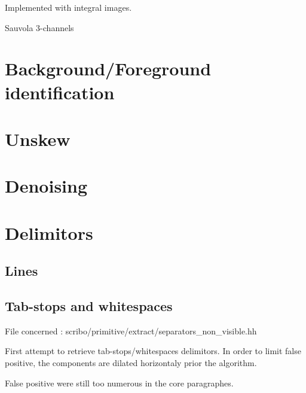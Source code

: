 \documentclass[a4]{book}
\begin{document}
Implemented with integral images. \cite{Faisal.integral_images}

\par{Sauvola 3-channels}



\section{Background/Foreground identification}



\section{Unskew}



\section{Denoising}



\section{Delimitors}

\subsection{Lines}

\subsection{Tab-stops and whitespaces}

File concerned : scribo/primitive/extract/separators\_non\_visible.hh

First attempt to retrieve tab-stops/whitespaces delimitors.  In order
to limit false positive, the components are dilated horizontaly prior
the algorithm.

False positive were still too numerous in the core paragraphes.
\end{document}
